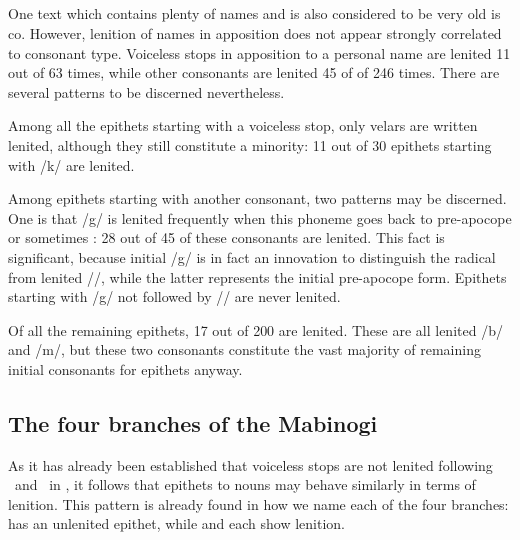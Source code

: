 \subsection{}
One text which contains plenty of names and is also considered to be very old is \gls{co}. However, lenition of names in apposition does not appear strongly correlated to consonant type. Voiceless stops in apposition to a personal name are lenited 11 out of 63 times, while other consonants are lenited 45 of of 246 times. There are several patterns to be discerned nevertheless.

Among all the epithets starting with a voiceless stop, only velars are written lenited, although they still constitute a minority: 11 out of 30 epithets starting with /k/ are lenited. 

Among epithets starting with another consonant, two patterns may be discerned. One is that /g\cw/ is lenited frequently when this phoneme goes back to pre-apocope \pc{*\cw} or sometimes : 28 out of 45 of these consonants are lenited. This fact is significant, because initial /g\cw/ is in fact an innovation to distinguish the radical from lenited /\cw/, while the latter represents the initial pre-apocope form. Epithets starting with /g/ not followed by /\cw/ are never lenited. 

Of all the remaining epithets, 17 out of 200 are lenited. These are all lenited /b/ and /m/, but these two consonants constitute the vast majority of remaining initial consonants for epithets anyway.
\subsection{The four branches of the Mabinogi}
As it has already been established that voiceless stops are not lenited following \ei\ and \oes\ in , it follows that epithets to nouns may behave similarly in terms of lenition. This pattern is already found in how we name each of the four branches:  has an unlenited epithet, while  and  each show lenition. 

